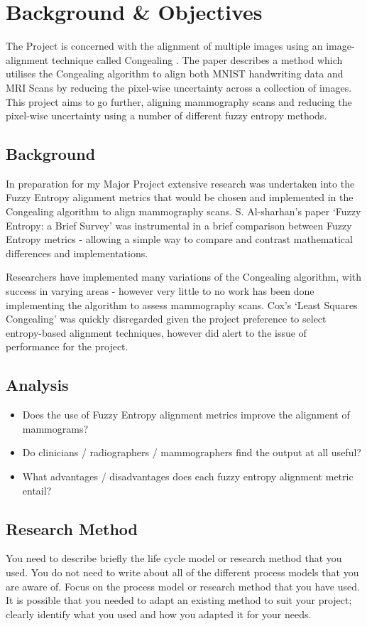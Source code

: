 \chapter{Background \& Objectives}

The Project is concerned with the alignment of multiple images using an image-alignment technique called Congealing \cite{joint-alignment}. The paper describes a method which utilises the Congealing algorithm to align both MNIST handwriting data and MRI Scans by reducing the pixel-wise uncertainty across a collection of images. This project aims to go further, aligning mammography scans and reducing the pixel-wise uncertainty using a number of different fuzzy entropy methods.

\section{Background}
In preparation for my Major Project extensive research was undertaken into the Fuzzy Entropy alignment metrics that would be chosen and implemented in the Congealing algorithm to align mammography scans. S. Al-sharhan's paper `Fuzzy Entropy: a Brief Survey' \cite{fuzzy-entropy} was instrumental in a brief comparison between Fuzzy Entropy metrics - allowing a simple way to compare and contrast mathematical differences and implementations.

Researchers have implemented many variations of the Congealing algorithm, with success in varying areas - however very little to no work has been done implementing the algorithm to assess mammography scans. Cox's `Least Squares Congealing' \cite{Cox_Sridharan_Lucey_Cohn_2008} was quickly disregarded given the project preference to select entropy-based alignment techniques, however did alert to the issue of performance for the project.

\section{Analysis}

\begin{itemize}
\item Does the use of Fuzzy Entropy alignment metrics improve the alignment of mammograms?
\item Do clinicians / radiographers / mammographers find the output at all useful?
\item What advantages / disadvantages does each fuzzy entropy alignment metric entail?
\end{itemize}
\section{Research Method}
You need to describe briefly the life cycle model or research method that you used. You do not need to write about all of the different process models that you are aware of. Focus on the process model or research method that you have used. It is possible that you needed to adapt an existing method to suit your project; clearly identify what you used and how you adapted it for your needs.
